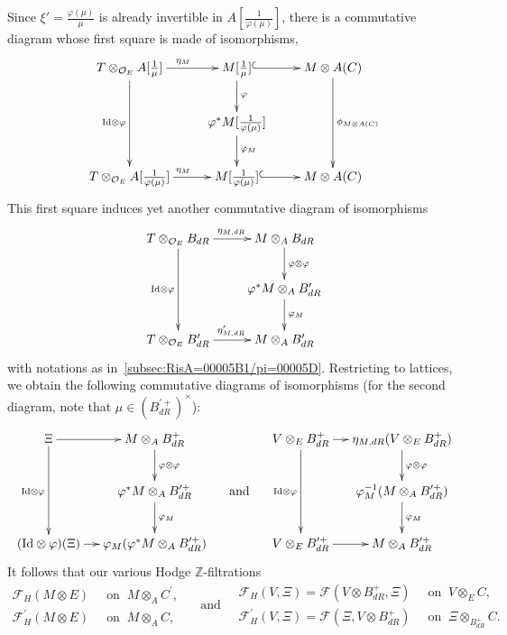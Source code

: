 \documentclass[11pt]{article}
\theoremstyle{definition}
\numberwithin{equation}{section}
\numberwithin{figure}{section}
\numberwithin{table}{section}
\newcommand*{\dR}{dR}
\begin{document}
Since $\xi'=\frac{\varphi(\mu)}{\mu}$ is already invertible in $A[\frac{1}{\varphi(\mu)}]$, there is a commutative diagram whose first square is made of isomorphisms,
\[
\xymatrix{T\otimes_{\mathcal{O}_{E}}A[{\frac{1}{\mu}}]\ar[dd]_{\mathrm{Id}\otimes\varphi}\ar[r]^{\eta_{M}} & M[{\frac{1}{\mu}}]\ar[d]^{\varphi}\ar@{^{(}->}[r] & M\otimes A(C)\ar[dd]^{\phi_{M\otimes A(C)}}\\
& \varphi^{\ast}M[{\frac{1}{\varphi(\mu)}}]\ar[d]^{\varphi_{M}}\\
T\otimes_{\mathcal{O}_{E}}A[{\frac{1}{\varphi(\mu)}]}\ar[r]^{\eta_{M}} & M[{\frac{1}{\varphi(\mu)}}]\ar@{^{(}->}[r] & M\otimes A(C) }
\]
This first square induces yet another commutative diagram of isomorphisms
\[
\xymatrix{T\otimes_{\mathcal{O}_{E}}B_{\dR}\ar[dd]_{\mathrm{Id}\otimes\varphi}\ar[r]^{\eta_{M,\dR}} & M\otimes_{A}B_{\dR}\ar[d]^{\varphi\otimes\varphi}\\
& \varphi^{\ast}M\otimes_{A}B_{\dR}^{\prime}\ar[d]^{\varphi_{M}}\\
T\otimes_{\mathcal{O}_{E}}B_{\dR}^{\prime}\ar[r]^{\eta_{M,\dR}^{\prime}} & M\otimes_{A}B_{\dR}^{\prime} }
\]
with notations as in~\ref{subsec:RisA=00005B1/pi=00005D}. Restricting to lattices, we obtain the following commutative diagrams of isomorphisms (for the second diagram, note that $\mu\in(B_{\dR}^{\prime+})^{\times}$):
\[
\xymatrix@C=1pc{\Xi\ar[dd]_{\mathrm{Id}\otimes\varphi}\ar[r] & M\otimes_{A}B_{\dR}^{+}\ar[d]^{\varphi\otimes\varphi} & & V\otimes_{E}B_{\dR}^{+}\ar[dd]_{\mathrm{Id}\otimes\varphi}\ar[r] & \eta_{M,\dR}(V\otimes_{E}B_{\dR}^{+})\ar[d]^{\varphi\otimes\varphi}\\
& \varphi^{\ast}M\otimes_{A}B_{\dR}^{\prime+}\ar[d]^{\varphi_{M}} & \text{and} & & \varphi_{M}^{-1}(M\otimes_{A}B_{\dR}^{\prime+})\ar[d]^{\varphi_{M}}\\
(\mathrm{Id}\otimes\varphi)(\Xi)\ar[r] & \varphi_{M}(\varphi^{\ast}M\otimes_{A}B_{\dR}^{\prime+}) & & V\otimes_{E}B_{\dR}^{\prime+}\ar[r] & M\otimes_{A}B_{\dR}^{\prime+} }
\]
It follows that our various Hodge $\mathbb{Z}$-filtrations
\[
\begin{aligned}
\mathcal{F}_{H}(M\otimes E)\;\;&\text{on}\;\; M\otimes_{A}C^{\prime},\\
\mathcal{F}_{H}^{\prime}(M\otimes E)\;\;&\text{on}\;\; M\otimes_{A}C,
\end{aligned}\quad\text{ and}\quad
\begin{aligned}
\mathcal{F}_{H}(V,\Xi)=\mathcal{F}(V\otimes B_{\dR}^{+},\Xi)\;\;&\text{on}\;\; V\otimes_{E}C,\\
\mathcal{F}_{H}^{\prime}(V,\Xi)=\mathcal{F}(\Xi,V\otimes B_{\dR}^{+})\;\;&\text{on}\;\;\Xi\otimes_{B_{\dR}^{+}}C.
\end{aligned}
\]
\end{document}
